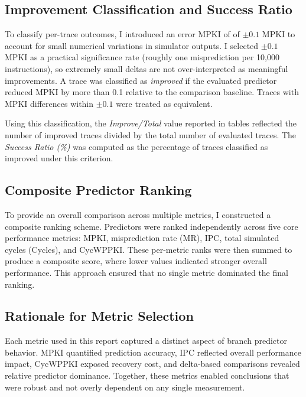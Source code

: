 \documentclass[11pt,a4paper]{article}
\begin{document}
\subsection{Improvement Classification and Success Ratio}
\label{sec:improvement-classification}

To classify per-trace outcomes, I introduced an error MPKI of of $\pm 0.1$ MPKI to account
for small numerical variations in simulator outputs. I selected $\pm 0.1$ MPKI as a practical
significance rate (roughly one misprediction per 10,000 instructions), so extremely small deltas
are not over-interpreted as meaningful improvements. A trace was classified as \emph{improved} if
the evaluated predictor reduced MPKI by more than 0.1 relative to the comparison baseline. Traces
with MPKI differences within $\pm 0.1$ were treated as equivalent.

Using this classification, the \emph{Improve/Total} value reported in tables reflected the number
of improved traces divided by the total number of evaluated traces. The \emph{Success Ratio (\%)}
was computed as the percentage of traces classified as improved under this criterion.

\subsection{Composite Predictor Ranking}

To provide an overall comparison across multiple metrics, I constructed a composite ranking
scheme. Predictors were ranked independently across five core performance metrics: MPKI,
misprediction rate (MR), IPC, total simulated cycles (Cycles), and CycWPPKI. These per-metric
ranks were then summed to produce a composite score, where lower values indicated stronger
overall performance. This approach ensured that no single metric dominated the final ranking.

\subsection{Rationale for Metric Selection}

Each metric used in this report captured a distinct aspect of branch predictor behavior. MPKI
quantified prediction accuracy, IPC reflected overall performance impact, CycWPPKI exposed
recovery cost, and delta-based comparisons revealed relative predictor dominance. Together, these
metrics enabled conclusions that were robust and not overly dependent on any single measurement.
\end{document}
